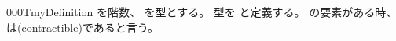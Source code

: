 \documentclass[index]{subfiles}
\begin{document}
\begin{myBlock}{000T}{myDefinition}
  を階数、
  を型とする。
  型を
  と定義する。
  の要素がある時、
  は(contractible)であると言う。
\end{myBlock}
\end{document}
